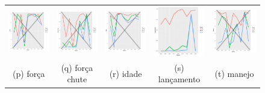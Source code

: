 \documentclass[doc,apacite,oneside,a4paper,12pt]{apa6}
\begin{document}
\begin{figure}
\begin{tabular}{ccccc}
  \includegraphics[width=25mm]{forca_result_trans_media} & \includegraphics[width=25mm]{forcachute_result_trans_media}  &   \includegraphics[width=25mm]{idade_result_trans_media} &
  \includegraphics[width=25mm]{lancamento_result_trans_media}  & \includegraphics[width=25mm]{manejo_result_trans_media}  \\
 \scriptsize{(p) força} & \scriptsize{(q) força chute } & \scriptsize{(r) idade} & \scriptsize{(s) lançamento} & \scriptsize{(t) manejo}\\[3pt]
 

\end{tabular}
\end{figure}
\end{document}
